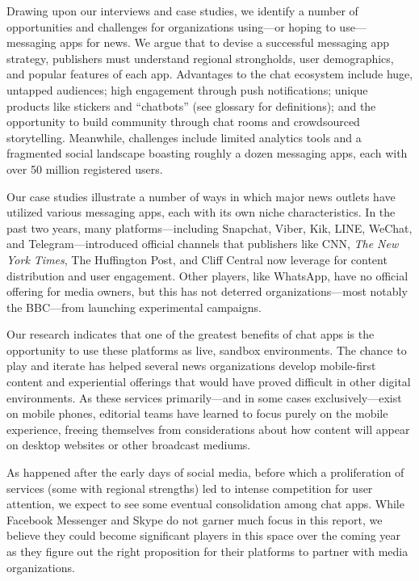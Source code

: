 \documentclass[notoc, symmetric, nobib, nols]{towcenter-guideto-book}
\begin{document}
Drawing upon our interviews and case studies, we identify a number of opportunities and challenges for organizations using---or hoping to use---messaging apps for news. We argue that to devise a successful messaging app strategy, publishers must understand regional strongholds, user demographics, and popular features of each app. Advantages to the chat ecosystem include huge, untapped audiences; high engagement through push notifications; unique products like stickers and ``chatbots'' (see glossary for definitions); and the opportunity to build community through chat rooms and crowdsourced storytelling. Meanwhile, challenges include limited analytics tools and a fragmented social landscape boasting roughly a dozen messaging apps, each with over 50 million registered users.

Our case studies illustrate a number of ways in which major news outlets have utilized various messaging apps, each with its own niche characteristics. In the past two years, many platforms---including Snapchat, Viber, Kik, LINE, WeChat, and Telegram---introduced official channels that publishers like CNN, \textit{The New York Times}, The Huffington Post, and Cliff Central now leverage for content distribution and user engagement. Other players, like WhatsApp, have no official offering for media owners, but this has not deterred organizations---most notably the BBC---from launching experimental campaigns.

Our research indicates that one of the greatest benefits of chat apps is the opportunity to use these platforms as live, sandbox environments. The chance to play and iterate has helped several news organizations develop mobile-first content and experiential offerings that would have proved difficult in other digital environments. As these services primarily---and in some cases exclusively---exist on mobile phones, editorial teams have learned to focus purely on the mobile experience, freeing themselves from considerations about how content will appear on desktop websites or other broadcast mediums.

As happened after the early days of social media, before which a proliferation of services (some with regional strengths) led to intense competition for user attention, we expect to see some eventual consolidation among chat apps. While Facebook Messenger and Skype do not garner much focus in this report, we believe they could become significant players in this space over the coming year as they figure out the right proposition for their platforms to partner with media organizations.
\end{document}

